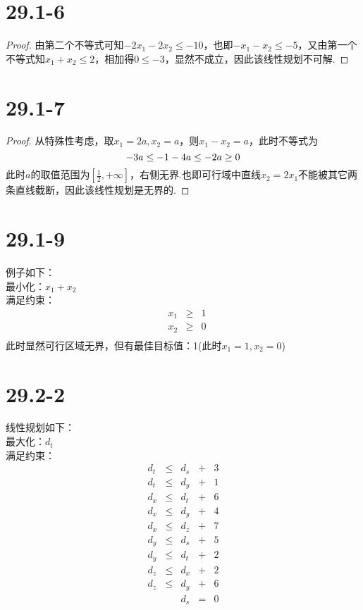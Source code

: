 \documentclass[twocolumn]{article}
\newenvironment{SChinese}{%
	\CJKfamily{gbsn}%
	\CJKtilde
	\CJKnospace}{}
\begin{document}
\begin{CJK}{UTF8}{}
\begin{SChinese}
			\section*{29.1-6}
				\begin{proof}
				由第二个不等式可知$-2x_1-2x_2\le-10$，也即$-x_1-x_2\le-5$，又由第一个不等式知$x_1+x_2\le2$，相加得$0\le-3$，显然不成立，因此该线性规划不可解.				\end{proof}
			\section*{29.1-7}
				\begin{proof}	
				从特殊性考虑，取$x_1=2a,x_2=a$，则$x_1-x_2=a$，此时不等式为\begin{displaymath}
					-3a\le-1 \\
					-4a\le-2 \\
					a\ge 0
				\end{displaymath}
				此时$a$的取值范围为$[\frac{1}{2},+\infty]$，右侧无界.也即可行域中直线$x_2=2x_1$不能被其它两条直线截断，因此该线性规划是无界的.
			    \end{proof}
			\section*{29.1-9}
				例子如下：\\
				最小化：$x_1+x_2$\\
				满足约束：\begin{displaymath}
				\begin{matrix}
				& x_1 & \ge & 1 \\
				& x_2 & \ge & 0 \\
				\end{matrix}
				\end{displaymath}
				此时显然可行区域无界，但有最佳目标值：1(此时$x_1=1,x_2=0$)
			\section*{29.2-2}
				线性规划如下：\\
				最大化：$d_t$\\
				满足约束：\begin{displaymath}
				\begin{matrix}
					d_t & \le & d_s & + & 3 \\
					d_t & \le & d_y & + & 1 \\
					d_x & \le & d_t & + & 6 \\
					d_x & \le & d_y & + & 4 \\
					d_x & \le & d_z & + & 7 \\
					d_y & \le & d_s & + & 5 \\
					d_y & \le & d_t & + & 2 \\
					d_z & \le & d_x & + & 2 \\
					d_z & \le & d_y & + & 6 \\
					    &     & d_s & = & 0 
				\end{matrix}
				\end{displaymath}

\end{SChinese}
\end{CJK}
\end{document}
